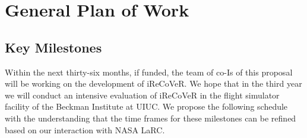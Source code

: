 \documentclass[letter,onecolumn,12pt]{aiaa-tc}
\newcommand{\Lone}{\mathcal{L}_1}
\begin{document}



\section{General Plan of Work}

\subsection{Key Milestones}

Within the next thirty-six months, if funded, the team of co-Is of this proposal will be working on the development of iReCoVeR. We hope that in the third year we will conduct an intensive evaluation of iReCoVeR in the flight simulator facility of the Beckman Institute at UIUC. We propose the following schedule with the understanding that the time frames for these milestones can be refined based on our interaction with NASA LaRC.
\end{document}

